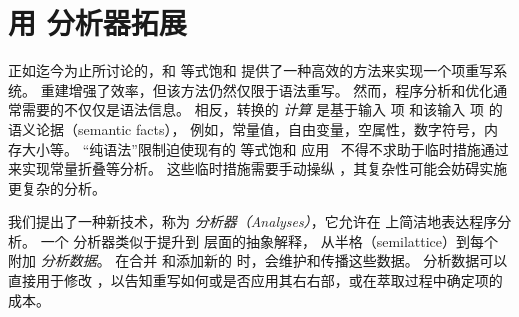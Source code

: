 \section{用 \eclass 分析器拓展 \Egraphs}
\label{sec:extensions}

正如迄今为止所讨论的，\egraphs 和 等式饱和 提供了一种高效的方法来实现一个项重写系统。
重建增强了效率，但该方法仍然仅限于语法重写。
然而，程序分析和优化通常需要的不仅仅是语法信息。
相反，转换的 \emph{计算} 是基于输入 项 和该输入 项 的语义论据（semantic facts），
  例如，常量值，自由变量，空属性，数字符号，内存大小等。
“纯语法”限制迫使现有的 等式饱和 应用~\cite{eqsat, eqsat-llvm, herbie} 
  不得不求助于临时措施通过 \egraph 来实现常量折叠等分析。
这些临时措施需要手动操纵 \egraph ，其复杂性可能会妨碍实施更复杂的分析。


我们提出了一种新技术，称为 \textit{\eclass 分析器（\eclass Analyses）}，它允许在 \egraph 上简洁地表达程序分析。
一个 \eclass 分析器类似于提升到 \egraph 层面的抽象解释，
  从半格（semilattice）到每个\eclass 附加 \textit{分析数据}。%
在合并 \eclasses 和添加新的 \enodes 时，\egraph 会维护和传播这些数据。
分析数据可以直接用于修改 \egraph，以告知重写如何或是否应用其右右部，或在萃取过程中确定项的成本。

